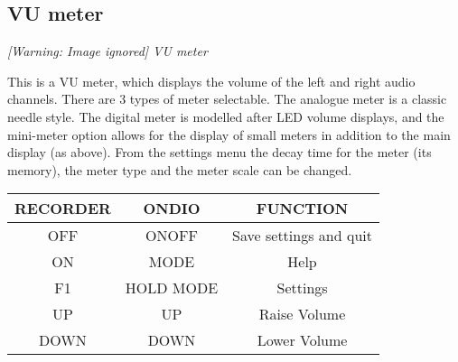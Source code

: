 \subsection{VU meter}
{\centering\itshape
  [Warning: Image ignored] %
 \newline
VU meter
\par}

This is a VU meter, which displays the volume of the left and right
audio channels. There are 3 types of meter selectable.  The analogue
meter is a classic needle style.  The digital meter is modelled after
LED volume displays, and the mini{}-meter option allows for the display
of small meters in addition to the main display (as above).  From the
settings menu the decay time for the meter (its memory), the meter type
and the meter scale can be changed. 

\begin{table}[h!]
\begin{tabular}{|c|c|c|}
\hline
RECORDER & ONDIO & FUNCTION \\\hline
OFF & ONOFF & Save settings and quit \\\hline
ON & MODE & Help \\\hline
F1 & HOLD MODE & Settings \\\hline
UP & UP & Raise Volume \\\hline
DOWN & DOWN & Lower Volume \\\hline
\end{tabular}
\end{table}

